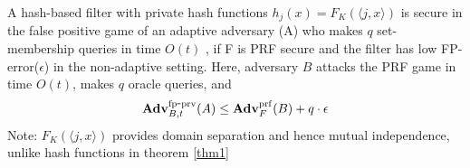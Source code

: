 \newcommand{\FK}{F_K(\langle j,x \rangle)}
\newcommand{\rhoK}{\rho(\langle j,x \rangle)}
\begin{theorem}\label{thm2}
A hash-based filter with private hash functions $h_j(x) = \FK$ is secure in the false positive game of an adaptive adversary (A) who makes $q$ set-membership queries in time $O(t)$ , if F is PRF secure and the filter has low FP-error($\epsilon$) in the non-adaptive setting. Here, adversary $B$ attacks the PRF game in time $O(t)$, makes $q$ oracle queries, and 
\begin{equation}
\mathrm{\mathbf{Adv}}^{\mathrm{fp\mbox{-}prv}}_{B,t}(A) \leq  \mathbf{Adv}^{\mathrm{prf}}_{F}(B) + q \cdot \epsilon
\end{equation}
Note: $\FK$ provides domain separation and hence mutual independence, unlike hash functions in theorem \ref{thm1}
\end{theorem}

